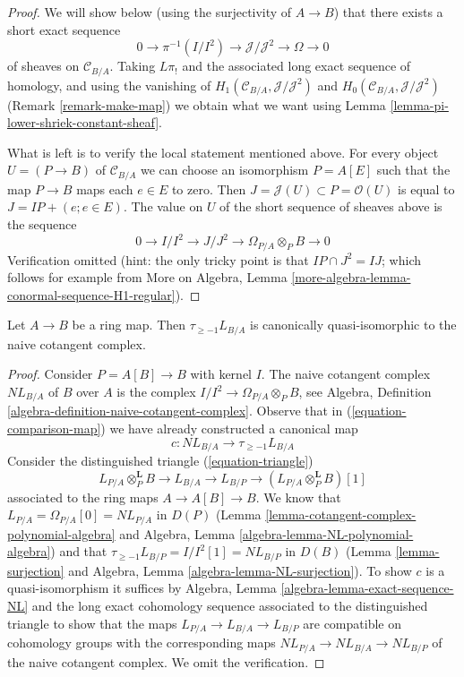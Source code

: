 \begin{proof}
We will show below (using the surjectivity of $A \to B$)
that there exists a short exact sequence
$$
0 \to \pi^{-1}(I/I^2) \to \mathcal{J}/\mathcal{J}^2 \to \Omega \to 0
$$
of sheaves on $\mathcal{C}_{B/A}$. Taking $L\pi_!$ and
the associated long exact sequence of homology, and using the
vanishing of $H_1(\mathcal{C}_{B/A}, \mathcal{J}/\mathcal{J}^2)$ and
$H_0(\mathcal{C}_{B/A}, \mathcal{J}/\mathcal{J}^2)$
(Remark \ref{remark-make-map}) we obtain what we want using
Lemma \ref{lemma-pi-lower-shriek-constant-sheaf}.

\medskip\noindent
What is left is to verify the local statement mentioned above.
For every object $U = (P \to B)$ of $\mathcal{C}_{B/A}$
we can choose an isomorphism $P = A[E]$ such that the map
$P \to B$ maps each $e \in E$ to zero. Then
$J = \mathcal{J}(U) \subset P = \mathcal{O}(U)$
is equal to $J = IP + (e; e \in E)$. The value on $U$ of the short sequence
of sheaves above is the sequence
$$
0 \to I/I^2 \to J/J^2 \to \Omega_{P/A} \otimes_P B \to 0
$$
Verification omitted (hint: the only tricky point is that
$IP \cap J^2 = IJ$; which follows for example from
More on Algebra, Lemma \ref{more-algebra-lemma-conormal-sequence-H1-regular}).
\end{proof}

\begin{lemma}
\label{lemma-relation-with-naive-cotangent-complex}
Let $A \to B$ be a ring map. Then $\tau_{\geq -1}L_{B/A}$
is canonically quasi-isomorphic to the naive cotangent complex.
\end{lemma}

\begin{proof}
Consider $P = A[B] \to B$ with kernel $I$. The naive cotangent
complex $NL_{B/A}$ of $B$ over $A$ is the complex
$I/I^2 \to \Omega_{P/A} \otimes_P B$,
see Algebra, Definition \ref{algebra-definition-naive-cotangent-complex}.
Observe that in (\ref{equation-comparison-map}) we have already
constructed a canonical map
$$
c : NL_{B/A} \longrightarrow \tau_{\geq -1}L_{B/A}
$$
Consider the distinguished triangle (\ref{equation-triangle})
$$
L_{P/A} \otimes_P^\mathbf{L} B \to L_{B/A} \to L_{B/P} \to 
(L_{P/A} \otimes_P^\mathbf{L} B)[1]
$$
associated to the ring maps $A \to A[B] \to B$. We know that
$L_{P/A} = \Omega_{P/A}[0] = NL_{P/A}$ in $D(P)$
(Lemma \ref{lemma-cotangent-complex-polynomial-algebra}
and
Algebra, Lemma \ref{algebra-lemma-NL-polynomial-algebra})
and that
$\tau_{\geq -1}L_{B/P} = I/I^2[1] = NL_{B/P}$ in $D(B)$
(Lemma \ref{lemma-surjection} and
Algebra, Lemma \ref{algebra-lemma-NL-surjection}).
To show $c$ is a quasi-isomorphism it suffices by
Algebra, Lemma \ref{algebra-lemma-exact-sequence-NL}
and the long exact cohomology sequence associated to the
distinguished triangle
to show that the maps $L_{P/A} \to L_{B/A} \to L_{B/P}$ are compatible
on cohomology groups with the corresponding maps
$NL_{P/A} \to NL_{B/A} \to NL_{B/P}$
of the naive cotangent complex. We omit the verification.
\end{proof}




